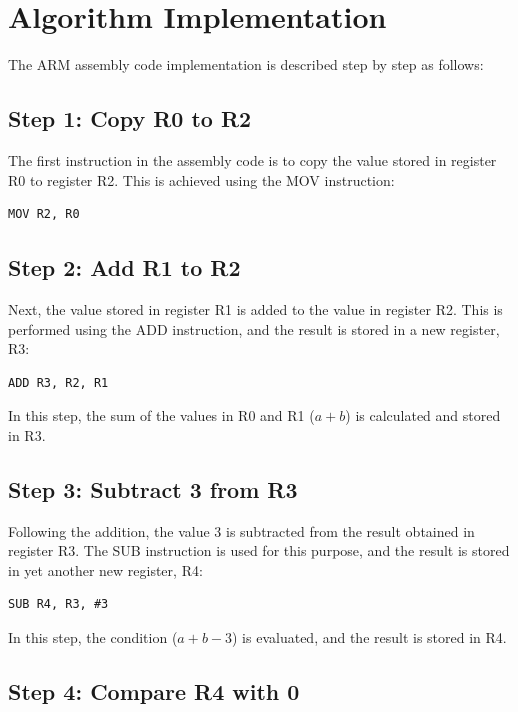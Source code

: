 \section{Algorithm Implementation}

The ARM assembly code implementation is described step by step as follows:

\subsection{Step 1: Copy R0 to R2}

The first instruction in the assembly code is to copy the value stored in register R0 to register R2. This is achieved using the MOV instruction:

\begin{verbatim}
MOV R2, R0
\end{verbatim}

\subsection{Step 2: Add R1 to R2}

Next, the value stored in register R1 is added to the value in register R2. This is performed using the ADD instruction, and the result is stored in a new register, R3:

\begin{verbatim}
ADD R3, R2, R1
\end{verbatim}

In this step, the sum of the values in R0 and R1 ($a + b$) is calculated and stored in R3.

\subsection{Step 3: Subtract 3 from R3}

Following the addition, the value 3 is subtracted from the result obtained in register R3. The SUB instruction is used for this purpose, and the result is stored in yet another new register, R4:

\begin{verbatim}
SUB R4, R3, #3
\end{verbatim}

In this step, the condition ($a + b - 3$) is evaluated, and the result is stored in R4.

\subsection{Step 4: Compare R4 with 0}

